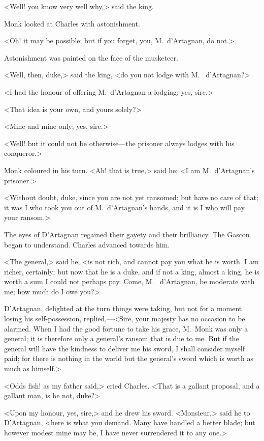 <Well! you know very well why,> said the king.

Monk looked at Charles with astonishment.

<Oh! it may be possible; but if you forget, you, M.~d'Artagnan, do not.>

Astonishment was painted on the face of the musketeer.

<Well, then, duke,> said the king, <do you not lodge with M.~ d'Artagnan?>

<I had the honour of offering M.~d'Artagnan a lodging; yes, sire.>

<That idea is your own, and yours solely?>

<Mine and mine only; yes, sire.>

<Well! but it could not be otherwise—the prisoner always lodges with his conqueror.>

Monk coloured in his turn. <Ah! that is true,> said he; <I am M.~d'Artagnan's prisoner.>

<Without doubt, duke, since you are not yet ransomed; but have no care of that; it was I who took you out of M.~d'Artagnan's hands, and it is I who will pay your ransom.>

The eyes of D'Artagnan regained their gayety and their brilliancy. The Gascon began to understand. Charles advanced towards him.

<The general,> said he, <is not rich, and cannot pay you what he is worth. I am richer, certainly; but now that he is a duke, and if not a king, almost a king, he is worth a sum I could not perhaps pay. Come, M.~ d'Artagnan, be moderate with me; how much do I owe you?>

D'Artagnan, delighted at the turn things were taking, but not for a moment losing his self-possession, replied,—<Sire, your majesty has no occasion to be alarmed. When I had the good fortune to take his grace, M.~Monk was only a general; it is therefore only a general's ransom that is due to me. But if the general will have the kindness to deliver me his sword, I shall consider myself paid; for there is nothing in the world but the general's sword which is worth as much as himself.>

<Odds fish! as my father said,> cried Charles. <That is a gallant proposal, and a gallant man, is he not, duke?>

<Upon my honour, yes, sire,> and he drew his sword. <Monsieur,> said he to D'Artagnan, <here is what you demand. Many have handled a better blade; but however modest mine may be, I have never surrendered it to any one.>

